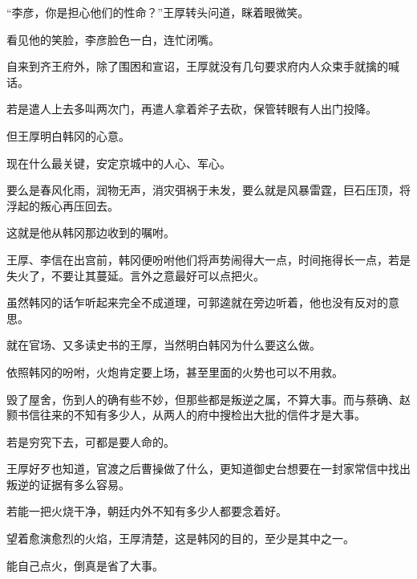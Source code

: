 “李彦，你是担心他们的性命？”王厚转头问道，眯着眼微笑。

看见他的笑脸，李彦脸色一白，连忙闭嘴。

自来到齐王府外，除了围困和宣诏，王厚就没有几句要求府内人众束手就擒的喊话。

若是遣人上去多叫两次门，再遣人拿着斧子去砍，保管转眼有人出门投降。

但王厚明白韩冈的心意。

现在什么最关键，安定京城中的人心、军心。

要么是春风化雨，润物无声，消灾弭祸于未发，要么就是风暴雷霆，巨石压顶，将浮起的叛心再压回去。

这就是他从韩冈那边收到的嘱咐。

王厚、李信在出宫前，韩冈便吩咐他们将声势闹得大一点，时间拖得长一点，若是失火了，不要让其蔓延。言外之意最好可以点把火。

虽然韩冈的话乍听起来完全不成道理，可郭逵就在旁边听着，他也没有反对的意思。

就在官场、又多读史书的王厚，当然明白韩冈为什么要这么做。

依照韩冈的吩咐，火炮肯定要上场，甚至里面的火势也可以不用救。

毁了屋舍，伤到人的确有些不妙，但那些都是叛逆之属，不算大事。而与蔡确、赵颢书信往来的不知有多少人，从两人的府中搜检出大批的信件才是大事。

若是穷究下去，可都是要人命的。

王厚好歹也知道，官渡之后曹操做了什么，更知道御史台想要在一封家常信中找出叛逆的证据有多么容易。

若能一把火烧干净，朝廷内外不知有多少人都要念着好。

望着愈演愈烈的火焰，王厚清楚，这是韩冈的目的，至少是其中之一。

能自己点火，倒真是省了大事。


